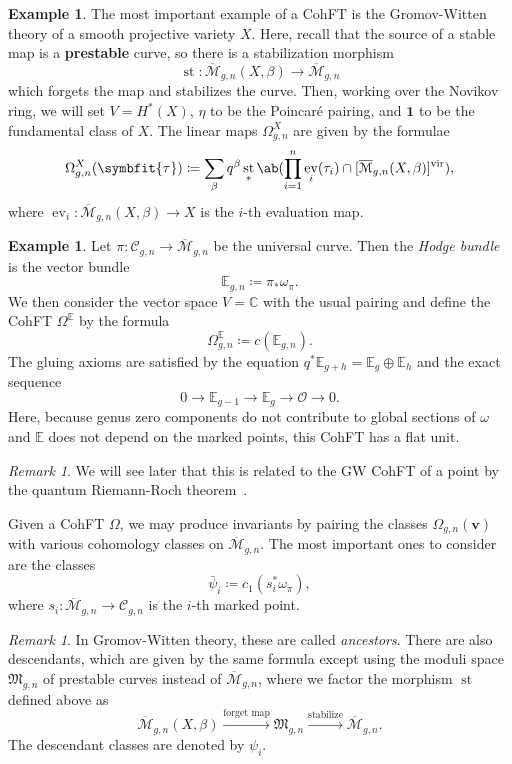 \documentclass[10pt,oldfontcommands,oneside]{memoir}
\theoremstyle{definition}
\newtheorem{exm}[thm]{Example}
\theoremstyle{remark}
\newtheorem{rmk}[thm]{Remark}
\theoremstyle{plain}
\theoremstyle{definition}
\theoremstyle{remark}
\newcommand{\C}{\mathbb{C}}
\newcommand{\E}{\mathbb{E}}
\newcommand{\Mbar}{\overline{\mathcal{M}}}
\newcommand{\mc}[1]{\mathcal{#1}}
\newcommand{\mf}[1]{\mathfrak{#1}}
\newcommand{\mbf}[1]{\mathbf{#1}}
\newcommand{\bv}{\mbf{v}}
\newcommand{\btau}{\symbfit{\tau}}
\newcommand{\mr}[1]{\mathrm{#1}}
\newcommand{\1}{\mathbf{1}}
\newcommand{\2}{\mathbf{2}}
\newcommand{\3}{\mathbf{3}}
\newcommand{\vir}{\mr{vir}}
\DeclareMathOperator{\ev}{ev}
\DeclareMathOperator{\st}{st}
\begin{document}
\begin{exm}
    The most important example of a CohFT is the Gromov-Witten theory of a smooth projective variety $X$. Here, recall that the source of a stable map is a \textbf{prestable} curve, so there is a stabilization morphism
    \[ \st \colon \Mbar_{g,n}(X,\beta) \to \Mbar_{g,n} \]
    which forgets the map and stabilizes the curve. Then, working over the Novikov ring, we will set $V = H^*(X)$, $\eta$ to be the Poincar\'e pairing, and $\1$ to be the fundamental class of $X$. The linear maps $\Omega^X_{g,n}$ are given by the formulae
    \[ \Omega_{g,n}^X(\btau) \coloneqq \sum_{\beta} q^{\beta} \st_* \ab(\prod_{i=1}^n \ev_i(\tau_i) \cap [\Mbar_{g,n}(X,\beta)]^{\vir}), \]
    where $\ev_i \colon \Mbar_{g,n}(X,\beta) \to X$ is the $i$-th evaluation map.
\end{exm}

\begin{exm}
    Let $\pi \colon \mc{C}_{g,n} \to \Mbar_{g,n}$ be the universal curve. Then the \textit{Hodge bundle} is the vector bundle 
    \[ \E_{g,n} \coloneqq \pi_* \omega_{\pi}. \]
    We then consider the vector space $V = \C$ with the usual pairing and define the CohFT $\Omega^{\E}$ by the formula
    \[ \Omega^{\E}_{g,n} \coloneqq c(\E_{g,n}). \]
    The gluing axioms are satisfied by the equation $q^* \E_{g+h} = \E_g \oplus \E_h$ and the exact sequence
    \[ 0 \to \E_{g-1} \to \E_g \to \mc{O} \to 0. \]
    Here, because genus zero components do not contribute to global sections of $\omega$ and $\E$ does not depend on the marked points, this CohFT has a flat unit.
\end{exm}

\begin{rmk}
    We will see later that this is related to the GW CohFT of a point by the quantum Riemann-Roch theorem~\cite{qrr}. 
\end{rmk}

Given a CohFT $\Omega$, we may produce invariants by pairing the classes $\Omega_{g,n}(\bv)$ with various cohomology classes on $\Mbar_{g,n}$. The most important ones to consider are the classes
\[ \bar{\psi}_i \coloneqq c_1( s_i^* \omega_{\pi} ), \]
where $s_i \colon \Mbar_{g,n} \to \mc{C}_{g,n}$ is the $i$-th marked point.

\begin{rmk}
    In Gromov-Witten theory, these are called \textit{ancestors}. There are also descendants, which are given by the same formula except using the moduli space $\mf{M}_{g,n}$ of prestable curves instead of $\Mbar_{g,n}$, where we factor the morphism $\st$ defined above as
    \[ \Mbar_{g,n}(X,\beta) \xrightarrow{\text{forget map}} \mf{M}_{g,n} \xrightarrow{\text{stabilize}} \Mbar_{g,n}. \]
    The descendant classes are denoted by $\psi_i$.
\end{rmk}
\end{document}

